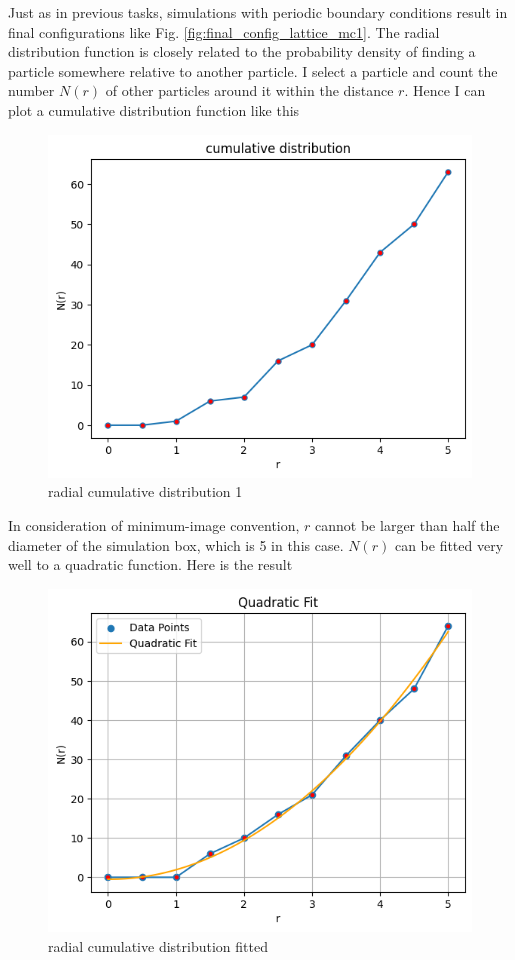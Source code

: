 \documentclass[letterpaper,12pt]{article}
\numberwithin{equation}{section}
\begin{document}
Just as in previous tasks, simulations with periodic boundary conditions result in final configurations like Fig. \ref{fig:final_config_lattice_mc1}. The radial distribution function is closely related to the probability density of finding a particle somewhere relative to another particle. I select a particle and count the number $N(r)$ of other particles around it within the distance $r$. Hence I can plot a cumulative distribution function like this
\begin{figure}[H]
    \centering
    \includegraphics{Project/cumulative_distribution_1.png}
    \caption{radial cumulative distribution 1}
    \label{fig:cumulative_distribution_1}
\end{figure}
In consideration of minimum-image convention, $r$ cannot be larger than half the diameter of the simulation box, which is 5 in this case. $N(r)$ can be fitted very well to a quadratic function. Here is the result 
\begin{figure}[H]
    \centering
    \includegraphics{Project/cumulative_distribution_fit.png}
    \caption{radial cumulative distribution fitted}
    \label{fig:cumulative_distribution_fit}
\end{figure} 
\end{document}
